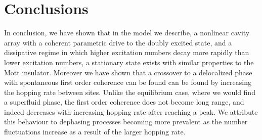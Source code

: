 \section{Conclusions}

In conclusion, we have shown that in the model we describe, a nonlinear cavity array with a coherent parametric drive to the doubly excited state, and a dissipative regime in which higher excitation numbers decay more rapidly than lower excitation numbers, a stationary state exists with similar properties to the Mott insulator. Moreover we have shown that a crossover to a delocalized phase with spontaneous first order coherence can be found can be found by increasing the hopping rate between sites. Unlike the equilibrium case, where we would find a superfluid phase, the first order coherence does not become long range, and indeed decreases with increasing hopping rate after reaching a peak. We attribute this behaviour to dephasing processes becoming more prevalent as the number fluctuations increase as a result of the larger hopping rate. 